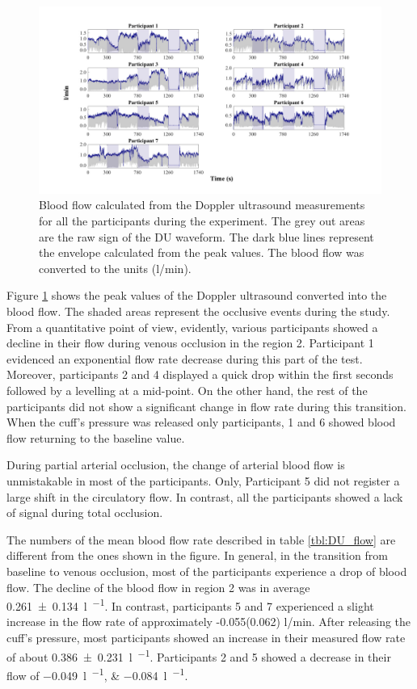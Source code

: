 \begin{figure}[!htb]
	\includegraphics[width=\textwidth,height=\textheight,keepaspectratio,trim={2.5cm 0cm 2.5cm 0 cm},clip]{figure16}    
	\caption[Blood flow calculated from Doppler ultrasond device all along the whole expetiment]{Blood flow calculated from the Doppler ultrasound measurements for all the participants during the experiment. The grey out areas are the raw sign of the DU waveform. The dark blue lines represent the envelope calculated from the peak values. The blood flow was converted to the units (\si[per-mode=symbol]{\litre\per\minute}).}
	\label{fig:DU_flow}
\end{figure}

Figure \ref{fig:DU_flow} shows the peak values of the Doppler ultrasound converted into the blood flow. The shaded areas represent the occlusive events during the study. From a quantitative point of view, evidently, various participants showed a decline in their flow during venous occlusion in the region 2.  Participant 1 evidenced an exponential flow rate decrease during this part of the test. Moreover, participants 2 and 4 displayed a quick drop within the first seconds followed by a levelling at a mid-point. On the other hand, the rest of the participants did not show a significant change in flow rate during this transition. When the cuff's pressure was released only participants, 1 and 6 showed blood flow returning to the baseline value.  

During partial arterial occlusion, the change of arterial blood flow is unmistakable in most of the participants. Only, Participant 5 did not register a large shift in the circulatory flow. In contrast, all the participants showed a lack of signal during total occlusion. 

The numbers of the mean blood flow rate described in table \ref{tbl:DU_flow} are different from the ones shown in the figure. In general, in the transition from baseline to venous occlusion, most of the participants experience a drop of blood flow. The decline of the blood flow in region 2 was in average \SI{0.261(0134)}{\litre\per\min}. In contrast, participants 5 and 7 experienced a slight increase in the flow rate of approximately -0.055(0.062) l/min. After releasing the cuff's pressure, most participants showed an increase in their measured flow rate of about \SI{0.386(0231)}{\litre\per\min}. Participants 2 and  5 showed a decrease in their flow of \SIlist{-0.049;-0.084}{\litre\per\min}. 

